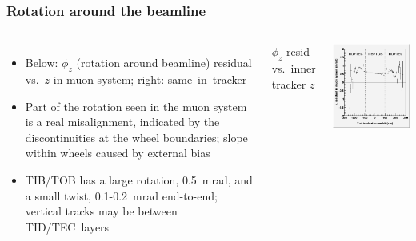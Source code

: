 \documentclass[compress]{beamer}
\begin{document}
\begin{frame}
\frametitle{Rotation around the beamline}

\begin{columns}

\begin{itemize}
\item Below: $\phi_z$ (rotation around beamline) \mbox{residual\hspace{-0.5 cm}}
vs.\ $z$ in muon system; right: \mbox{same in tracker\hspace{-1 cm}}

\item Part of the rotation seen in the muon system is a real misalignment,
  indicated by the discontinuities at the wheel boundaries;
  slope within wheels caused by external bias

\item TIB/TOB has a large rotation, 0.5~mrad, and a
  small twist, 0.1-0.2~mrad end-to-end; vertical tracks may be between \mbox{TID/TEC layers\hspace{-1 cm}}
\end{itemize}

\scriptsize $\phi_z$ resid vs.\ inner tracker $z$

\includegraphics[width=\linewidth]{phiresid_from_tracker_inner.png}
\end{columns}


\end{frame}
\end{document}
